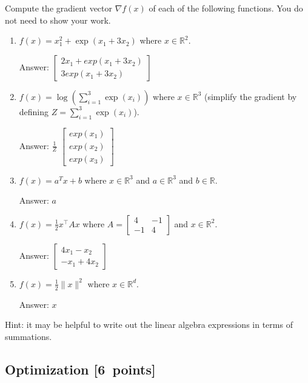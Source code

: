 \documentclass{article}
\newcommand{\blu}[1]{{\textcolor{blu}{#1}}}
\newenvironment{answer}{\par\begingroup\color{gre}Answer: }{\endgroup}
\let\ask\blu
\newcommand\pts[1]{\textcolor{pointscolour}{[#1~points]}}
\def\R{\mathbb{R}}
\newcommand{\norm}[1]{\lVert #1 \rVert}
\begin{document}
  \ask{Compute the gradient vector $\nabla f(x)$ of each of the following functions.} You do not need to show your work.
  \begin{enumerate}
  \item $f(x) = x_1^2 + \exp(x_1 + 3x_2)$ where $x \in \R^2$.
  \begin{answer}
  $ \left[
    \begin{array} { c }
    2x_1 + exp(x_1 + 3x_2) \\
    3exp(x_1 + 3x_2)
    \end{array}
    \right]
  $
  \end{answer}
  \item $f(x) = \log\left(\sum_{i=1}^3\exp(x_i)\right)$ where $x \in \R^3$ (simplify the gradient by defining $Z = \sum_{i=1}^3\exp(x_i)$).
  \begin{answer}
  $ \frac{1}{Z} $
  $ \left[
    \begin{array} { c }
    exp(x_1) \\
    exp(x_2) \\
    exp(x_3)
    \end{array}
    \right]
  $
  \end{answer}
  \item $f(x) = a^Tx + b$ where $x \in \R^3$ and $a \in \R^3$ and $b \in \R$.
  \begin{answer}
  $
  a
  $
  \end{answer}
  \item $f(x) = \frac12 x^\top A x$ where $A=\left[ \begin{array}{cc}
  4 & -1 \\
  -1 & 4 \end{array} \right]$ and $x \in \mathbb{R}^2$.
  \begin{answer}
   $
    \left[
    \begin{array} { c }
    4x_1 - x_2 \\
    -x_1 + 4x_2
    \end{array}
    \right]
  $

  \end{answer}
  \item $f(x) = \frac{1}{2}\norm{x}^2$ where $x \in \R^d$.
  \begin{answer}
  $
  x
  $
  \end{answer}
  \end{enumerate}

  Hint: it may be helpful to write out the linear algebra expressions in terms of summations.


  \subsection{Optimization \pts{6}}
\end{document}
